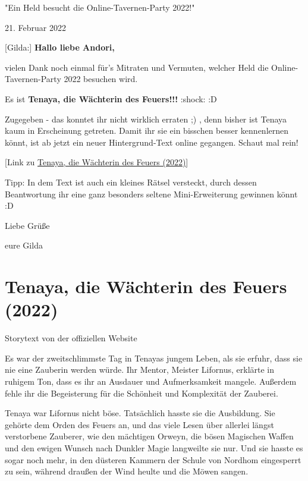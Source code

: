 \documentclass[10pt, a4paper, oneside]{book}
\newcommand{\fillbreak}{\vspace*{\fill}\columnbreak}
\newcommand{\storytext}[1]{%
    \section{#1}%
    \label{Storytext: #1}%
}
\newcommand{\refstorytext}[1]{\hyperref[Storytext: #1]{#1}}
\newcommand{\bildmitts}[2][height=0.32\textwidth,width=0.48\textwidth,keepaspectratio]{%
    \begin{center}
        \texttt{[image: Chronik der Andorversen/Bilder/\#2]}
    \end{center}
}
\begin{document}
\begin{multicols}{2}

\begin{center}
    "Ein Held besucht die Online-Tavernen-Party 2022!"

    21. Februar 2022
\end{center}

[Gilda:] \textbf{Hallo liebe Andori,}

vielen Dank noch einmal für's Mitraten und Vermuten, welcher Held die Online-Tavernen-Party 2022 besuchen wird.

Es ist \textbf{Tenaya, die Wächterin des Feuers!!!} :shock: :D


Zugegeben - das konntet ihr nicht wirklich erraten ;) , denn bisher ist Tenaya kaum in Erscheinung getreten. Damit ihr sie ein bisschen besser kennenlernen könnt, ist ab jetzt ein neuer Hintergrund-Text online gegangen. Schaut mal rein!

[Link zu \refstorytext{Tenaya, die Wächterin des Feuers (2022)}]

Tipp: In dem Text ist auch ein kleines Rätsel versteckt, durch dessen Beantwortung ihr eine ganz besonders seltene Mini-Erweiterung gewinnen könnt :D


Liebe Grüße

eure Gilda






\fillbreak
\storytext{Tenaya, die Wächterin des Feuers (2022)}

\begin{center}
    Storytext von der offiziellen Website
\end{center}

Es war der zweitschlimmste Tag in Tenayas jungem Leben, als sie erfuhr, dass sie nie eine Zauberin werden würde. Ihr Mentor, Meister Lifornus, erklärte in ruhigem Ton, dass es ihr an Ausdauer und Aufmerksamkeit mangele. Außerdem fehle ihr die Begeisterung für die Schönheit und Komplexität der Zauberei.

Tenaya war Lifornus nicht böse. Tatsächlich hasste sie die Ausbildung. Sie gehörte dem Orden des Feuers an, und das viele Lesen über allerlei längst verstorbene Zauberer, wie den mächtigen Orweyn, die bösen Magischen Waffen und den ewigen Wunsch nach Dunkler Magie langweilte sie nur. Und sie hasste es sogar noch mehr, in den düsteren Kammern der Schule von Nordhom eingesperrt zu sein, während draußen der Wind heulte und die Möwen sangen.


\end{multicols}
\end{document}
